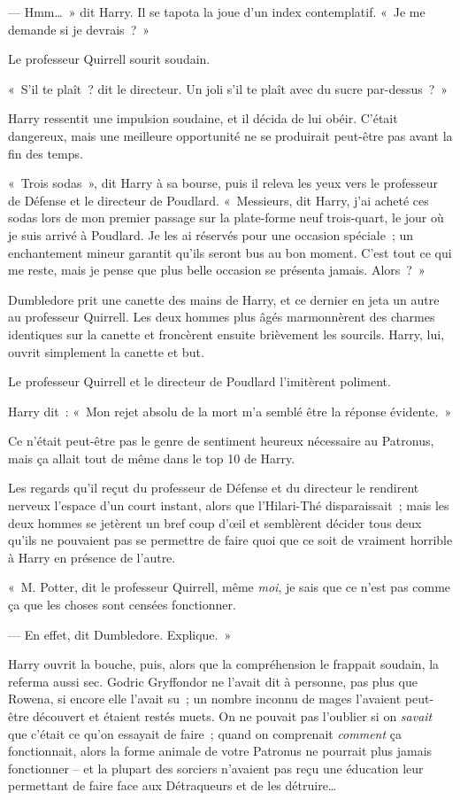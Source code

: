 --- Hmm…~» dit Harry. Il se tapota la joue d'un index contemplatif. «~Je me demande si je devrais~?~»

Le professeur Quirrell sourit soudain.

«~S'il te plaît~? dit le directeur. Un joli s'il te plaît avec du sucre par-dessus~?~»

Harry ressentit une impulsion soudaine, et il décida de lui obéir. C'était dangereux, mais une meilleure opportunité ne se produirait peut-être pas avant la fin des temps.

«~Trois sodas~», dit Harry à sa bourse, puis il releva les yeux vers le professeur de Défense et le directeur de Poudlard. «~Messieurs, dit Harry, j'ai acheté ces sodas lors de mon premier passage sur la plate-forme neuf trois-quart, le jour où je suis arrivé à Poudlard. Je les ai réservés pour une occasion spéciale~; un enchantement mineur garantit qu'ils seront bus au bon moment. C'est tout ce qui me reste, mais je pense que plus belle occasion se présenta jamais. Alors~?~»

Dumbledore prit une canette des mains de Harry, et ce dernier en jeta un autre au professeur Quirrell. Les deux hommes plus âgés marmonnèrent des charmes identiques sur la canette et froncèrent ensuite brièvement les sourcils. Harry, lui, ouvrit simplement la canette et but.

Le professeur Quirrell et le directeur de Poudlard l'imitèrent poliment.

Harry dit~: «~Mon rejet absolu de la mort m'a semblé être la réponse évidente.~»

Ce n'était peut-être pas le genre de sentiment heureux nécessaire au Patronus, mais ça allait tout de même dans le top 10 de Harry.

Les regards qu'il reçut du professeur de Défense et du directeur le rendirent nerveux l'espace d'un court instant, alors que l'Hilari-Thé disparaissait~; mais les deux hommes se jetèrent un bref coup d'œil et semblèrent décider tous deux qu'ils ne pouvaient pas se permettre de faire quoi que ce soit de vraiment horrible à Harry en présence de l'autre.

«~M. Potter, dit le professeur Quirrell, même \emph{moi}, je sais que ce n'est pas comme ça que les choses sont censées fonctionner.

--- En effet, dit Dumbledore. Explique.~»

Harry ouvrit la bouche, puis, alors que la compréhension le frappait soudain, la referma aussi sec. Godric Gryffondor ne l'avait dit à personne, pas plus que Rowena, si encore elle l'avait su~; un nombre inconnu de mages l'avaient peut-être découvert et étaient restés muets. On ne pouvait pas l'oublier si on \emph{savait} que c'était ce qu'on essayait de faire~; quand on comprenait \emph{comment} ça fonctionnait, alors la forme animale de votre Patronus ne pourrait plus jamais fonctionner -- et la plupart des sorciers n'avaient pas reçu une éducation leur permettant de faire face aux Détraqueurs et de les détruire…

